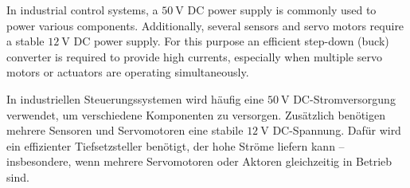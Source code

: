 


In industrial control systems, a $\SI{50}{\volt}$ DC power supply is commonly used to power various components.
Additionally, several sensors and servo motors require a stable $\SI{12}{\volt}$ DC power supply.
For this purpose an efficient step-down (buck) converter is required to provide high currents,
especially when multiple servo motors or actuators are operating simultaneously.

\begin{germanblock}
In industriellen Steuerungssystemen wird häufig eine $\SI{50}{\volt}$ DC-Stromversorgung verwendet,
um verschiedene Komponenten zu versorgen. Zusätzlich benötigen mehrere Sensoren und Servomotoren
eine stabile $\SI{12}{\volt}$ DC-Spannung. Dafür wird ein effizienter Tiefsetzsteller benötigt,
der hohe Ströme liefern kann – insbesondere, wenn mehrere Servomotoren oder Aktoren gleichzeitig 
in Betrieb sind.    
\end{germanblock}




